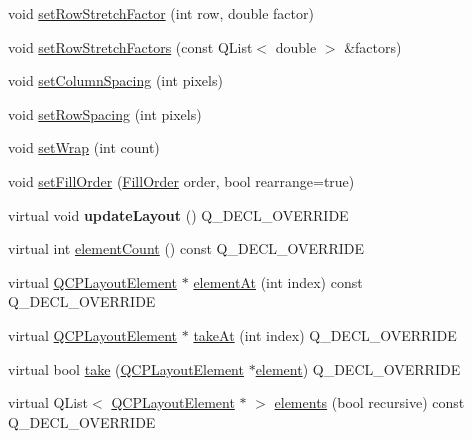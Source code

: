 \begin{DoxyCompactItemize}
void \hyperlink{class_q_c_p_layout_grid_a7b0273de5369bd93d942edbaf5b166ec}{set\+Row\+Stretch\+Factor} (int row, double factor)
\item 
void \hyperlink{class_q_c_p_layout_grid_a200b45f9c908f96ebadaa3c8d87a2782}{set\+Row\+Stretch\+Factors} (const Q\+List$<$ double $>$ \&factors)
\item 
void \hyperlink{class_q_c_p_layout_grid_a3a49272aba32bb0fddc3bb2a45a3dba0}{set\+Column\+Spacing} (int pixels)
\item 
void \hyperlink{class_q_c_p_layout_grid_aaef2cd2d456197ee06a208793678e436}{set\+Row\+Spacing} (int pixels)
\item 
void \hyperlink{class_q_c_p_layout_grid_ab36af18d77e4428386d02970382ee598}{set\+Wrap} (int count)
\item 
void \hyperlink{class_q_c_p_layout_grid_affc2f3cfd22f28698c5b29b960d2a391}{set\+Fill\+Order} (\hyperlink{class_q_c_p_layout_grid_a7d49ee08773de6b2fd246edfed353cca}{Fill\+Order} order, bool rearrange=true)
\item 
\mbox{\label{class_q_c_p_layout_grid_a6cf43f14d3fa335fd8758561ccf1f78c}} 
virtual void {\bfseries update\+Layout} () Q\+\_\+\+D\+E\+C\+L\+\_\+\+O\+V\+E\+R\+R\+I\+DE
\item 
virtual int \hyperlink{class_q_c_p_layout_grid_a9a8942aface780a02445ebcf14c48513}{element\+Count} () const Q\+\_\+\+D\+E\+C\+L\+\_\+\+O\+V\+E\+R\+R\+I\+DE
\item 
virtual \hyperlink{class_q_c_p_layout_element}{Q\+C\+P\+Layout\+Element} $\ast$ \hyperlink{class_q_c_p_layout_grid_a4288f174082555f6bd92021bdedb75dc}{element\+At} (int index) const Q\+\_\+\+D\+E\+C\+L\+\_\+\+O\+V\+E\+R\+R\+I\+DE
\item 
virtual \hyperlink{class_q_c_p_layout_element}{Q\+C\+P\+Layout\+Element} $\ast$ \hyperlink{class_q_c_p_layout_grid_a17dd220234d1bbf8835abcc666384d45}{take\+At} (int index) Q\+\_\+\+D\+E\+C\+L\+\_\+\+O\+V\+E\+R\+R\+I\+DE
\item 
virtual bool \hyperlink{class_q_c_p_layout_grid_aee961c2eb6cf8a85dcbc5a7d7b6c1a00}{take} (\hyperlink{class_q_c_p_layout_element}{Q\+C\+P\+Layout\+Element} $\ast$\hyperlink{class_q_c_p_layout_grid_a602b426609b4411cf6a93c3ddf3a381a}{element}) Q\+\_\+\+D\+E\+C\+L\+\_\+\+O\+V\+E\+R\+R\+I\+DE
\item 
virtual Q\+List$<$ \hyperlink{class_q_c_p_layout_element}{Q\+C\+P\+Layout\+Element} $\ast$ $>$ \hyperlink{class_q_c_p_layout_grid_a7d5b968b4cf57393e9e387976d91f8f7}{elements} (bool recursive) const Q\+\_\+\+D\+E\+C\+L\+\_\+\+O\+V\+E\+R\+R\+I\+DE

\end{DoxyCompactItemize}
